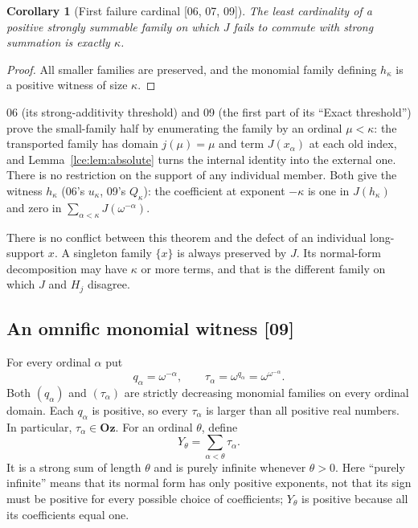 \documentclass[11pt,letterpaper]{article}
\numberwithin{equation}{section}
\newtheorem{corollary}[theorem]{Corollary}
\theoremstyle{definition}
\theoremstyle{remark}
\newcommand{\Oz}{\mathbf{Oz}}
\newcommand{\leref}[1]{Lemma~\ref{#1}}
\newcommand{\src}[1]{\textup{\textsf{\small[#1]}}}%
\begin{document}
\begin{corollary}[First failure cardinal \src{06, 07, 09}]\label{lce:cor:firstfailure}
The least cardinality of a positive strongly summable family on which $J$
fails to commute with strong summation is exactly $\kappa$.
\end{corollary}
\begin{proof}
All smaller families are preserved, and the monomial family defining
$h_\kappa$ is a positive witness of size $\kappa$.
\end{proof}
06 (its strong-additivity threshold) and 09 (the first part of its ``Exact
threshold'') prove the small-family half by enumerating the family by an
ordinal $\mu<\kappa$: the transported family has domain $j(\mu)=\mu$ and
term $J(x_\alpha)$ at each old index, and \leref{lce:lem:absolute} turns the
internal identity into the external one. There is no restriction on the
support of any individual member. Both give the witness $h_\kappa$ (06's
$u_\kappa$, 09's $Q_\kappa$): the coefficient at exponent $-\kappa$ is one in
$J(h_\kappa)$ and zero in $\sum_{\alpha<\kappa}J(\omega^{-\alpha})$.

There is no conflict between this theorem and the defect of an individual
long-support $x$. A singleton family $\{x\}$ is always preserved by $J$.
Its normal-form decomposition may have $\kappa$ or more terms, and that
is the different family on which $J$ and $H_j$ disagree.

\subsection{An omnific monomial witness \src{09}}
For every ordinal $\alpha$ put
\begin{equation}\label{lce:sg:eq:scales}
 q_\alpha=\omega^{-\alpha},\qquad
 \tau_\alpha=\omega^{q_\alpha}=\omega^{\omega^{-\alpha}}.
\end{equation}
Both $(q_\alpha)$ and $(\tau_\alpha)$ are strictly decreasing monomial
families on every ordinal domain. Each $q_\alpha$ is positive, so every
$\tau_\alpha$ is larger than all positive real numbers. In particular,
$\tau_\alpha\in\Oz$. For an ordinal $\theta$, define
\begin{equation}\label{lce:sg:eq:QZ}
 Y_\theta=\sum_{\alpha<\theta}\tau_\alpha.
\end{equation}
It is a strong sum of length $\theta$ and is purely infinite whenever
$\theta>0$. Here ``purely infinite'' means that its normal form has only
positive exponents, not that its sign must be positive for every possible
choice of coefficients; $Y_\theta$ is positive because all its coefficients
equal one.
\end{document}
